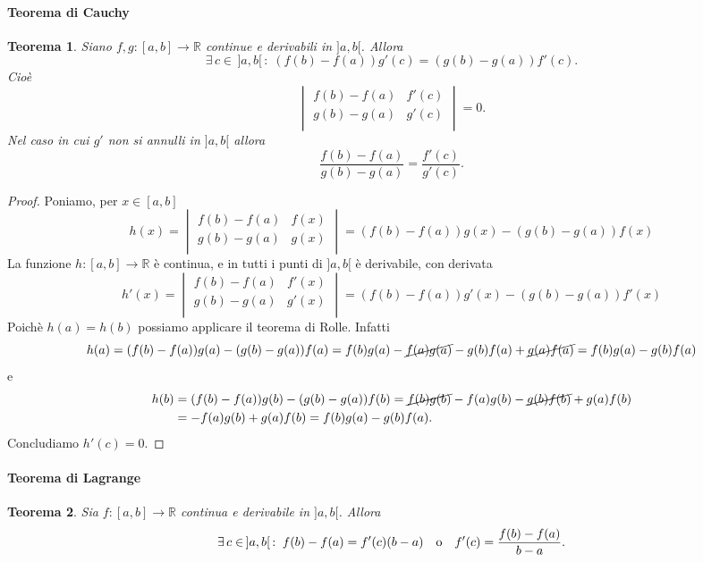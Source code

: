 \documentclass{article}
\theoremstyle{plain}
\newtheorem{thm}{Teorema}[section]
\theoremstyle{definition}
\theoremstyle{remark}
\begin{document}
\paragraph{Teorema di Cauchy}
\begin{bxthm}
\begin{thm}
    Siano $f,g:[a,b]\to\mathbb{R}$ continue e derivabili in $]a,b[$.
    Allora 
    \[\exists\, c\in\,]a,b[\,:\;(f(b)-f(a))g'(c)=(g(b)-g(a))f'(c).\]
    Cioè 
    \[\begin{vmatrix}
        f(b)-f(a)&f'(c)\\
        g(b)-g(a)&g'(c)\\
    \end{vmatrix}=0.\]
    Nel caso in cui $g'$ non si annulli in $]a,b[$ allora 
    \[\dfrac{f(b)-f(a)}{g(b)-g(a)}=\dfrac{f'(c)}{g'(c)}.\]
\end{thm}
\end{bxthm}
\begin{proof}
    Poniamo, per $x\in [a,b]$
    \[h(x)=\begin{vmatrix}
        f(b)-f(a)&f(x)\\
        g(b)-g(a)&g(x)\\
    \end{vmatrix}=(f(b)-f(a))g(x)-(g(b)-g(a))f(x)
    \]
    La funzione $h:[a,b]\to\mathbb{R}$ è continua, e in tutti i punti di $]a,b[$ è derivabile, con derivata
    \[h'(x)=\begin{vmatrix}
        f(b)-f(a)&f'(x)\\
        g(b)-g(a)&g'(x)\\
    \end{vmatrix}=(f(b)-f(a))g'(x)-(g(b)-g(a))f'(x)\]
    Poichè $h(a)=h(b)$ possiamo applicare il teorema di Rolle. 
    Infatti 
    \[h(a)=(f(b)-f(a))g(a)-(g(b)-g(a))f(a)=f(b)g(a)-\cancel{f(a)g(a)}-g(b)f(a)+\cancel{g(a)f(a)}=f(b)g(a)-g(b)f(a)\]
    e 
    \begin{align*}
        h(b)&=(f(b)-f(a))g(b)-(g(b)-g(a))f(b)=\cancel{f(b)g(b)}-f(a)g(b)-\cancel{g(b)f(b)}+g(a)f(b)\\
        &=-f(a)g(b)+g(a)f(b)=f(b)g(a)-g(b)f(a).
    \end{align*} 
    Concludiamo $h'(c)=0$.
\end{proof}

\vspace{10pt}

\paragraph{Teorema di Lagrange}
\begin{bxthm}
\begin{thm}
    Sia $f:[a,b]\to\mathbb{R}$ continua e derivabile in $]a,b[$. Allora 
    \[\exists\, c\in\,]a,b[ \,:\; f(b)-f(a)=f'(c)(b-a)\quad\textup{o}\quad f'(c)=\dfrac{f(b)-f(a)}{b-a}.\]
\end{thm}
\end{bxthm}
\end{document}
